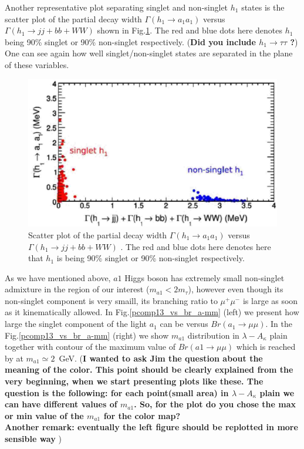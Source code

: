\documentclass[aps,12pt,superscriptaddress,nofootinbib,floatfix,showpacs]{revtex4}
\begin{document}
Another representative plot  separating
singlet and non-singlet $h_1$ states
is the scatter plot of  the partial decay width $\Gamma(h_1\to a_1 a_1)$
versus  $\Gamma(h_1\to jj +bb+WW)$ shown in Fig.\ref{gh1-aa_vs_gh1-conv}.
The red and blue dots here denotes $h_1$ 
being 90\% singlet or 90\% non-singlet respectively.
({\bf Did you include $h_1 \to \tau\tau$ ?})
One can see again how well  singlet/non-singlet states are separated
in the plane of these variables.
\begin{figure}[htb]
\begin{center}
\includegraphics[width=0.75\linewidth]{plots/gh1-aa_vs_gh1-conv.eps}
\caption{Scatter plot of  the partial decay width $\Gamma(h_1\to a_1 a_1)$
versus  $\Gamma(h_1\to jj +bb+WW)$ .
The red and blue dots here denotes here that $h_1$ is
being 90\% singlet or 90\% non-singlet respectively.
\label{gh1-aa_vs_gh1-conv}}
\end{center}
\end{figure}

As we have mentioned above,
$a1$ Higgs boson has extremely small non-singlet 
admixture  in the region of our interest
($m_{a1} < 2m_\tau$),  however even though its non-singlet component is very smaill,
its branching ratio to $\mu^+\mu^-$ is large as soon as 
it kinematically allowed.
In Fig.\ref{pcomp13_vs_br_a-mm} (left) we present how large the  singlet
component of the light  $a_1$ can be  versus $Br(a_1\to\mu\mu)$.
In the Fig.\ref{pcomp13_vs_br_a-mm} (right) we show $m_{a1}$ distribution
in $\lambda-A_\kappa$ plain together with contour of the maximum value of 
$Br(a1\to \mu\mu)$ which is reached by at $m_{a1}\simeq 2$~GeV.
({\bf I wanted to ask Jim the question about the meaning of the color.
     This point  should be clearly explained from the very beginning,
     when we start presenting plots like these.
     The question is the following: for each point(small area) in $\lambda-A_\kappa$
     plain we can have different values of $m_{a1}$. So, for the plot do you chose
     the max or min value of the  $m_{a1}$ for the color map?\\
     Another remark: eventually the left figure should be replotted in more 
     sensible way} )
\end{document}
